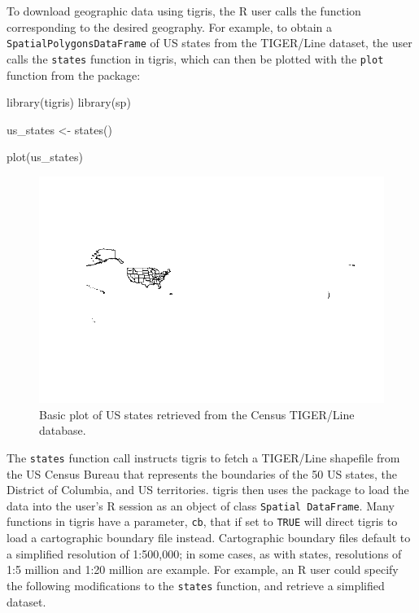 To download geographic data using tigris, the R user calls the function
corresponding to the desired geography. For example, to obtain a
\texttt{SpatialPolygonsDataFrame} of US states from the TIGER/Line
dataset, the user calls the \texttt{states} function in tigris, which
can then be plotted with the \texttt{plot} function from the
 package:

\begin{Schunk}
\begin{Sinput}
library(tigris)
library(sp)

us_states <- states()

plot(us_states)
\end{Sinput}
\end{Schunk}

\begin{figure}[htbp]
  \centering
  \includegraphics[width=\textwidth]{states}
  \caption{Basic plot of US states retrieved from the Census TIGER/Line database.}
  \label{figure:states}
\end{figure}

The \texttt{states} function call instructs tigris to fetch a TIGER/Line
shapefile from the US Census Bureau that represents the boundaries of
the 50 US states, the District of Columbia, and US territories. tigris
then uses the  package to load the data into the user's R
session as an object of class \texttt{Spatial\ DataFrame}. Many
functions in tigris have a parameter, \texttt{cb}, that if set to
\texttt{TRUE} will direct tigris to load a cartographic boundary file
instead. Cartographic boundary files default to a simplified resolution
of 1:500,000; in some cases, as with states, resolutions of 1:5 million
and 1:20 million are example. For example, an R user could specify the
following modifications to the \texttt{states} function, and retrieve a
simplified dataset.

